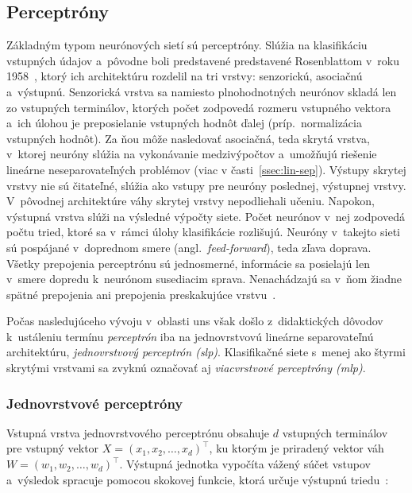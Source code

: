 \subsection{Perceptróny}\label{ssec:slp}

  Základným typom neurónových sietí sú perceptróny. Slúžia na klasifikáciu vstupných údajov a~pôvodne boli predstavené predstavené Rosenblattom v~roku 1958~\cite{rosenblattPerceptronProbabilisticModel1958}, ktorý ich architektúru rozdelil na tri vrstvy: senzorickú, asociačnú a~výstupnú. Senzorická vrstva sa namiesto plnohodnotných neurónov skladá len zo vstupných terminálov, ktorých počet zodpovedá rozmeru vstupného vektora a~ich úlohou je preposielanie vstupných hodnôt ďalej (príp.\ normalizácia vstupných hodnôt). Za ňou môže nasledovať asociačná, teda skrytá vrstva, v~ktorej neuróny slúžia na vykonávanie medzivýpočtov a~umožňujú riešenie lineárne neseparovateľných problémov (viac v časti~\ref{ssec:lin-sep}). Výstupy skrytej vrstvy nie sú čitateľné, slúžia ako vstupy pre neuróny poslednej, výstupnej vrstvy. V~pôvodnej architektúre váhy skrytej vrstvy nepodliehali učeniu. Napokon, výstupná vrstva slúži na výsledné výpočty siete. Počet neurónov v~nej zodpovedá počtu tried, ktoré sa v~rámci úlohy klasifikácie rozlišujú. Neuróny v~takejto sieti sú pospájané v~doprednom smere (angl.\ \emph{feed-forward}), teda zľava doprava. Všetky prepojenia perceptrónu sú jednosmerné, informácie sa posielajú len v~smere dopredu k~neurónom susediacim sprava. Nenachádzajú sa v~ňom žiadne spätné prepojenia ani prepojenia preskakujúce vrstvu~\cite{mehligMachineLearningNeural2021}.

  Počas nasledujúceho vývoju v~oblasti \acrshort{uns} však došlo z~didaktických dôvodov k~ustáleniu termínu \emph{perceptrón} iba na jednovrstvovú lineárne separovateľnú architektúru, \emph{jednovrstvový perceptrón (\acrshort{slp})}. Klasifikačné siete s~menej ako štyrmi skrytými vrstvami sa zvyknú označovať aj \emph{viacvrstvové perceptróny (\acrshort{mlp})}.
  
  \subsubsection{Jednovrstvové perceptróny}
  Vstupná vrstva jednovrstvového perceptrónu obsahuje $d$ vstupných terminálov pre vstupný vektor $X = {(x_1, x_2, \dots, x_d)}^{\top}$, ku ktorým je priradený vektor váh $W = {(w_1, w_2, \dots, w_d)}^{\top}$. Výstupná jednotka vypočíta vážený súčet vstupov a~výsledok spracuje pomocou skokovej funkcie, ktorá určuje výstupnú triedu~\cite{aggarwalNeuralNetworksDeep2018}:

